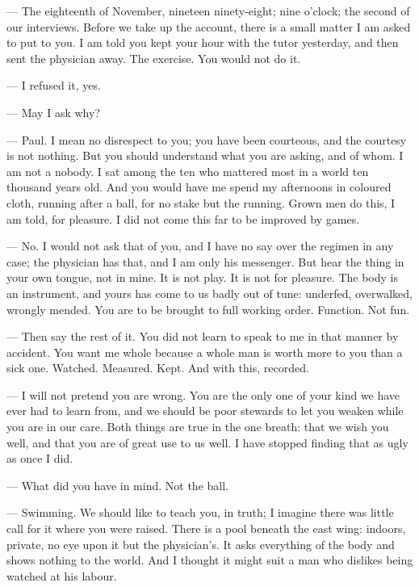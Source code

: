 
\begin{room}

--- The eighteenth of November, nineteen ninety-eight; nine o'clock; the second of our interviews. Before we take up the account, there is a small matter I am asked to put to you. I am told you kept your hour with the tutor yesterday, and then sent the physician away. The exercise. You would not do it.

--- I refused it, yes.

--- May I ask why?

--- Paul. I mean no disrespect to you; you have been courteous, and the courtesy is not nothing. But you should understand what you are asking, and of whom. I am not a nobody. I sat among the ten who mattered most in a world ten thousand years old. And you would have me spend my afternoons in coloured cloth, running after a ball, for no stake but the running. Grown men do this, I am told, for pleasure. I did not come this far to be improved by games.

--- No. I would not ask that of you, and I have no say over the regimen in any case; the physician has that, and I am only his messenger. But hear the thing in your own tongue, not in mine. It is not play. It is not for pleasure. The body is an instrument, and yours has come to us badly out of tune: underfed, overwalked, wrongly mended. You are to be brought to full working order. Function. Not fun.

--- Then say the rest of it. You did not learn to speak to me in that manner by accident. You want me whole because a whole man is worth more to you than a sick one. Watched. Measured. Kept. And with this, recorded.

--- I will not pretend you are wrong. You are the only one of your kind we have ever had to learn from, and we should be poor stewards to let you weaken while you are in our care. Both things are true in the one breath: that we wish you well, and that you are of great use to us well. I have stopped finding that as ugly as once I did.

--- What did you have in mind. Not the ball.

--- Swimming. We should like to teach you, in truth; I imagine there was little call for it where you were raised. There is a pool beneath the east wing: indoors, private, no eye upon it but the physician's. It asks everything of the body and shows nothing to the world. And I thought it might suit a man who dislikes being watched at his labour.


\end{room}
